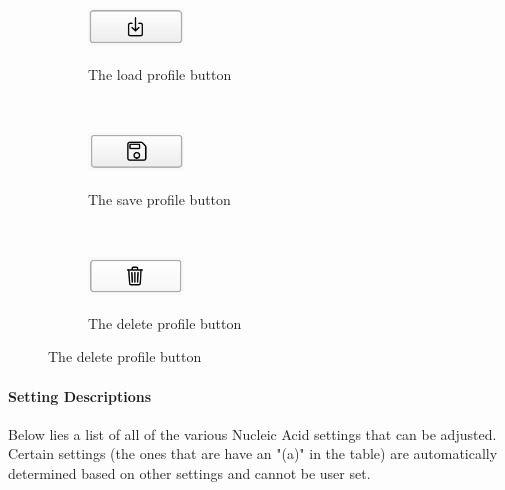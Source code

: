 \documentclass[titlepage]{article}
\begin{document}
	\begin{figure}[h]
		\centering
		\begin{subfigure}{.3\textwidth}
			\centering
			\caption{The load profile button}
			\includegraphics[width=1in]{load-profile-button.png}
			\label{fig:load-profile-button}
		\end{subfigure}%
		~
		\begin{subfigure}{.3\textwidth}
			\centering
			\caption{The save profile button}
			\includegraphics[width=1in]{save-profile-button.png}
			\label{fig:save-profile-button}
		\end{subfigure}%
		~
		\begin{subfigure}{.3\textwidth}
			\centering
			\caption{The delete profile button}
			\includegraphics[width=1in]{delete-profile-button.png}
			\label{fig:delete-profile-button}
		\end{subfigure}
	\end{figure}

	\paragraph{Setting Descriptions}
	Below lies a list of all of the various Nucleic Acid settings that can be adjusted. Certain settings (the ones that are have an "(a)" in the table) are automatically determined based on other settings and cannot be user set.
\end{document}
